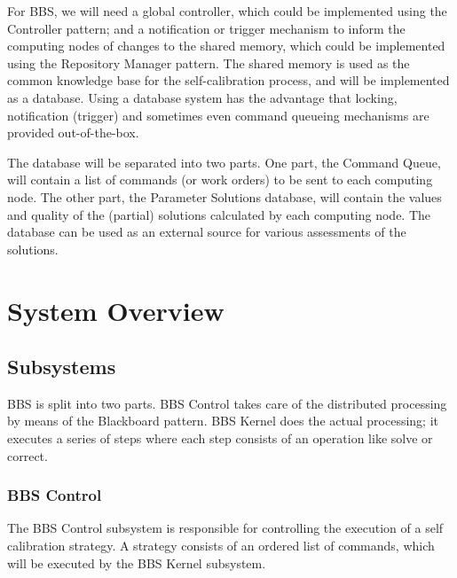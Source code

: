 \documentclass[10pt]{lofar}
\begin{document}
For BBS, we will need a global controller, which could be implemented using
the Controller pattern; and a notification or trigger mechanism to inform the
computing nodes of changes to the shared memory, which could be implemented
using the Repository Manager pattern. The shared memory is used as the common
knowledge base for the self-calibration process, and will be implemented as a
database. Using a database system has the advantage that locking, notification
(trigger) and sometimes even command queueing mechanisms are provided
out-of-the-box.

The database will be separated into two parts. One part, the Command Queue,
will contain a list of commands (or work orders) to be sent to each computing
node. The other part, the Parameter Solutions database, will contain the
values and quality of the (partial) solutions calculated by each computing
node. The database can be used as an external source for various assessments
of the solutions.

\cleardoublepage

\section{System Overview}
\label{sec:overview}

\subsection{Subsystems}
\label{subsec:subsystems}
BBS is split into two parts. BBS Control takes care of the distributed
processing by means of the Blackboard pattern. BBS Kernel does the actual
processing; it executes a series of steps where each step consists of an
operation like solve or correct.


\subsubsection{BBS Control}
\label{subsubsec:sys-control}

The BBS Control subsystem is responsible for controlling the execution of a
self calibration strategy. A strategy consists of an ordered list of commands,
which will be executed by the BBS Kernel subsystem.
\end{document}
